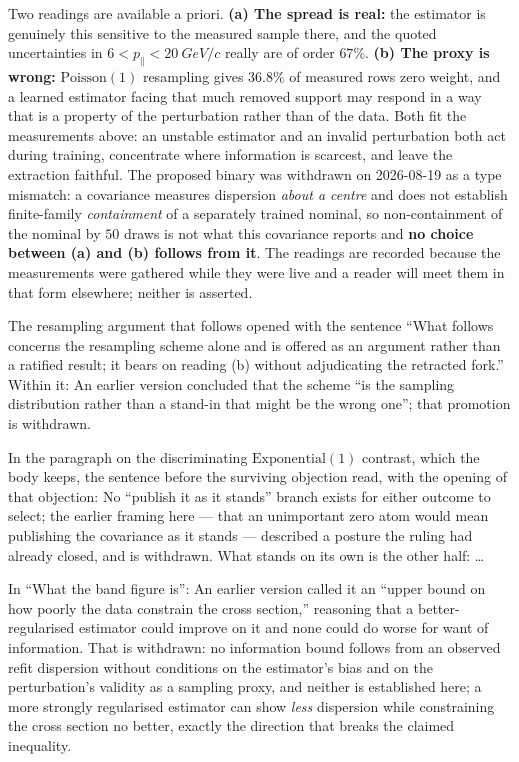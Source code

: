 Two readings are available a priori. \textbf{(a) The spread is real:} the estimator is genuinely this sensitive to the measured sample there, and the quoted uncertainties in $6<p_{\parallel}<\SI{20}{GeV/c}$ really are of order $67\%$. \textbf{(b) The proxy is wrong:} $\mathrm{Poisson}(1)$ resampling gives $36.8\%$ of measured rows zero weight, and a learned estimator facing that much removed support may respond in a way that is a property of the perturbation rather than of the data. Both fit the measurements above: an unstable estimator and an invalid perturbation both act during training, concentrate where information is scarcest, and leave the extraction faithful. The proposed binary was withdrawn on 2026-08-19 as a type mismatch: a covariance measures dispersion \emph{about a centre} and does not establish finite-family \emph{containment} of a separately trained nominal, so non-containment of the nominal by $50$ draws is not what this covariance reports and \textbf{no choice between (a) and (b) follows from it}. The readings are recorded because the measurements were gathered while they were live and a reader will meet them in that form elsewhere; neither is asserted.

The resampling argument that follows opened with the sentence ``What follows concerns the resampling scheme alone and is offered as an argument rather than a ratified result; it bears on reading (b) without adjudicating the retracted fork.'' Within it: An earlier version concluded that the scheme ``is the sampling distribution rather than a stand-in that might be the wrong one''; that promotion is withdrawn.

In the paragraph on the discriminating $\mathrm{Exponential}(1)$ contrast, which the body keeps, the sentence before the surviving objection read, with the opening of that objection: No ``publish it as it stands'' branch exists for either outcome to select; the earlier framing here --- that an unimportant zero atom would mean publishing the covariance as it stands --- described a posture the ruling had already closed, and is withdrawn. What stands on its own is the other half: \ldots

In ``What the band figure is'': An earlier version called it an ``upper bound on how poorly the data constrain the cross section,'' reasoning that a better-regularised estimator could improve on it and none could do worse for want of information. That is withdrawn: no information bound follows from an observed refit dispersion without conditions on the estimator's bias and on the perturbation's validity as a sampling proxy, and neither is established here; a more strongly regularised estimator can show \emph{less} dispersion while constraining the cross section no better, exactly the direction that breaks the claimed inequality.


